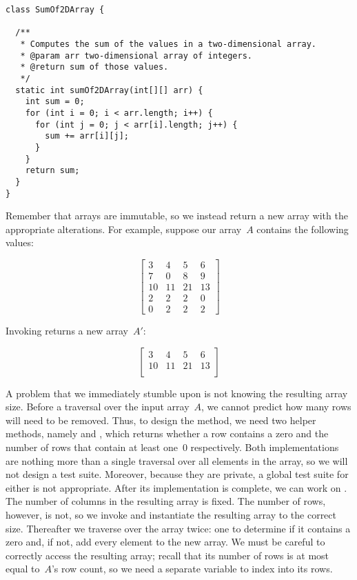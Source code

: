 \begin{lstlisting}[language=MyJava]
class SumOf2DArray {

  /**
   * Computes the sum of the values in a two-dimensional array.
   * @param arr two-dimensional array of integers.
   * @return sum of those values.
   */
  static int sumOf2DArray(int[][] arr) {
    int sum = 0;
    for (int i = 0; i < arr.length; i++) {
      for (int j = 0; j < arr[i].length; j++) {
        sum += arr[i][j];
      }
    }
    return sum;
  }
}
\end{lstlisting}

Remember that arrays are immutable, so we instead return a new array with the appropriate alterations.
For example, suppose our array~$A$ contains the following values:

\[
\begin{bmatrix}
  3&4&5&6\\
  7&0&8&9\\
  10&11&21&13\\
  2&2&2&0\\
  0&2&2&2
\end{bmatrix}
\]

\enlargethispage{-4\baselineskip}
\noindent{}Invoking  returns a new array~$A'$:

\[
\begin{bmatrix}
  3&4&5&6\\
  10&11&21&13\\
\end{bmatrix}
\]

A problem that we immediately stumble upon is not knowing the resulting array size.
Before a traversal over the input array~$A$, we cannot predict how many rows will need to be removed.
Thus, to design the  method, we need two helper methods, namely  and , which returns whether a row contains a zero and the number of rows that contain at least one~$0$ respectively.
Both implementations are nothing more than a single traversal over all elements in the array, so we will not design a test suite.
Moreover, because they are private, a global test suite for either is not appropriate.
After its implementation is complete, we can work on . 
The number of columns in the resulting array is fixed.
The number of rows, however, is not, so we invoke  and instantiate the resulting array to the correct size.
Thereafter we traverse over the array twice: one to determine if it contains a zero and, if not, add every element to the new array.
We must be careful to correctly access the resulting array; recall that its number of rows is at most equal to~$A$'s row count, so we need a separate variable to index into its rows.

